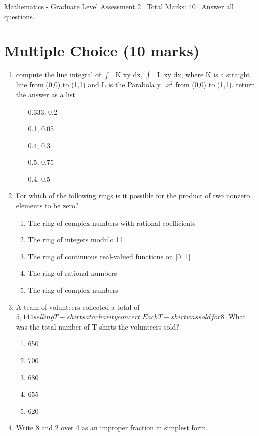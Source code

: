 \documentclass[12pt]{article}
\begin{document}
\begin{center}
Mathematics - Graduate Level Assessment 2 \
Total Marks: 40 \
Answer all questions.
\end{center}

\section*{Multiple Choice (10 marks)}
\begin{enumerate}[label=\arabic*.]
\item compute the line integral of \ensuremath{\int}\_K xy dx, \ensuremath{\int}\_L xy dx, where K is a straight line from (0,0) to (1,1) and L is the Parabola y=$x^2$ from (0,0) to (1,1). return the answer as a list
\begin{enumerate}[label=(\alph*)]
    \item [0.333, 0.2]
    \item [0.1, 0.05]
    \item [0.4, 0.3]
    \item [0.5, 0.75]
    \item [0.4, 0.5]
\end{enumerate}
\item For which of the following rings is it possible for the product of two nonzero elements to be zero?
\begin{enumerate}[label=(\alph*)]
    \item The ring of complex numbers with rational coefficients
    \item The ring of integers modulo 11
    \item The ring of continuous real-valued functions on [0, 1]
    \item The ring of rational numbers
    \item The ring of complex numbers
\end{enumerate}
\item A team of volunteers collected a total of $5,144 selling T-shirts at a charity concert. Each T-shirt was sold for $8. What was the total number of T-shirts the volunteers sold?
\begin{enumerate}[label=(\alph*)]
    \item 650
    \item 700
    \item 680
    \item 655
    \item 620
\end{enumerate}
\item Write 8 and 2 over 4 as an improper fraction in simplest form.

\end{enumerate}
\end{document}
